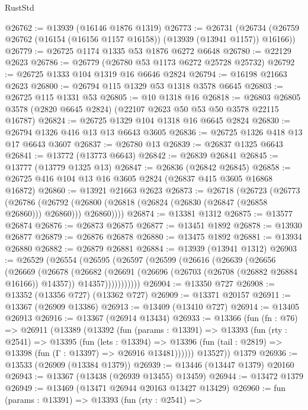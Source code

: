 \begin{lexlean}{RustStd}
\begin{coremodule}
@26762 := @13939 (@16146 @1876 @1319)
@26773 := @26731
    (@26734 (@26759 @26762 (@16154 (@16156 @1157 @16158)) (@13939 (@13941 @1157)) @16166))
@26779 := @26725 @1174 @1335 @53 @1876 @6272 @6648
@26780 := @22129 @2623
@26786 := @26779 (@26780 @53 @1173 @6272 @25728 @25732)
@26792 := @26725 @1333 @104 @1319 @16 @6646 @2824
@26794 := @16198 @21663 @2623
@26800 := @26794 @115 @1329 @53 @1318 @3578 @6645
@26803 := @26725 @115 @1331 @53
@26805 := @10 @1318 @16
@26818 := @26803 @26805 @3578 (@2820 @6645 @2824) (@22107 @2623 @50 @53 @50 @3578 @22115 @16787)
@26824 := @26725 @1329 @104 @1318 @16 @6645 @2824
@26830 := @26794 @1326 @416 @13 @13 @6643 @3605
@26836 := @26725 @1326 @418 @13 @17 @6643 @3607
@26837 := @26780 @13
@26839 := @26837 @1325 @6643
@26841 := @13772 (@13773 @6643)
@26842 := @26839 @26841
@26845 := @13777 (@13779 @1325 @13)
@26847 := @26836 (@26842 @26845)
@26858 := @26725 @416 @104 @13 @16 @3605 @2824 (@26837 @415 @3605 @16868 @16872)
@26860 := @13921 @21663 @2623
@26873 := @26718
    (@26723
      (@26773
        (@26786
          (@26792 (@26800 (@26818 (@26824 (@26830 (@26847 (@26858 @26860))) @26860))) @26860))))
@26874 := @13381 @1312
@26875 := @13577 @26874
@26876 := @26873 @26875
@26877 := @13451 @1892
@26878 := @13930 @26877
@26879 := @26876 @26878
@26880 := @13475 @1892
@26881 := @13934 @26880
@26882 := @26879 @26881
@26884 := @13939 (@13941 @1312)
@26903 := @26529
    (@26554
      (@26595
        (@26597
          (@26599
            (@26616
              (@26639
                (@26656
                  (@26669
                    (@26678
                      (@26682
                        (@26691
                          (@26696 (@26703 (@26708 (@26882 @26884 @16166)) @14357))
                          @14357)))))))))))
@26904 := @13350 @727
@26908 := @13352 (@13356 @727) (@13362 @727)
@26909 := @13371 @20157
@26911 := @13367 (@26909 @13386)
@26913 := @13409 (@13410 @727)
@26914 := @13405 @26913
@26916 := @13367 (@26914 @13434)
@26933 := @13366
    (fun (fn : @76) =>
    @26911
      (@13389
        (@13392
          (fun (params : @13391) =>
          @13393
            (fun (rty : @2541) =>
            @13395
              (fun (lets : @13394) =>
              @13396 (fun (tail : @2819) => @13398 (fun (Γ : @13397) => @26916 @13481))))))
        @13527))
    @1379
@26936 := @13533 (@26909 (@13384 @1379))
@26939 := @13446 (@13447 @1379) @20160
@26943 := @13367 (@13438 (@26939 @13455) @13459)
@26944 := @13472 @1379
@26949 := @13469 (@13471 @26944 @20163 @13427 @13429)
@26960 := fun (params : @13391) =>
  @13393
    (fun (rty : @2541) =>

\end{coremodule}
\end{lexlean}
